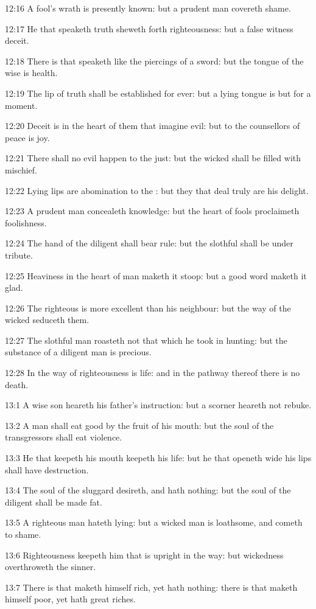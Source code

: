 12:16 A fool's wrath is presently known: but a prudent man covereth shame.

12:17 He that speaketh truth sheweth forth righteousness: but a false witness deceit.

12:18 There is that speaketh like the piercings of a sword: but the tongue of the wise is health.

12:19 The lip of truth shall be established for ever: but a lying tongue is but for a moment.

12:20 Deceit is in the heart of them that imagine evil: but to the counsellors of peace is joy.

12:21 There shall no evil happen to the just: but the wicked shall be filled with mischief.

12:22 Lying lips are abomination to the \LORD: but they that deal truly are his delight.

12:23 A prudent man concealeth knowledge: but the heart of fools proclaimeth foolishness.

12:24 The hand of the diligent shall bear rule: but the slothful shall be under tribute.

12:25 Heaviness in the heart of man maketh it stoop: but a good word maketh it glad.

12:26 The righteous is more excellent than his neighbour: but the way of the wicked seduceth them.

12:27 The slothful man roasteth not that which he took in hunting: but the substance of a diligent man is precious.

12:28 In the way of righteousness is life: and in the pathway thereof there is no death.

13:1 A wise son heareth his father's instruction: but a scorner heareth not rebuke.

13:2 A man shall eat good by the fruit of his mouth: but the soul of the transgressors shall eat violence.

13:3 He that keepeth his mouth keepeth his life: but he that openeth wide his lips shall have destruction.

13:4 The soul of the sluggard desireth, and hath nothing: but the soul of the diligent shall be made fat.

13:5 A righteous man hateth lying: but a wicked man is loathsome, and cometh to shame.

13:6 Righteousness keepeth him that is upright in the way: but wickedness overthroweth the sinner.

13:7 There is that maketh himself rich, yet hath nothing: there is that maketh himself poor, yet hath great riches.

